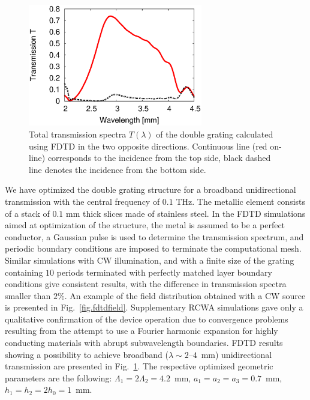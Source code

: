 \documentclass[10pt,letterpaper,twocolumn]{article} %
\begin{document}
\begin{figure}
 \begin{center}
 \includegraphics[width=3in]{fig3.eps}
\end{center}
\caption{Total transmission spectra $T(\lambda)$ of the double grating calculated using FDTD in the two opposite directions. Continuous line (red on-line) corresponds to the incidence from the top side, black dashed line denotes the incidence from the bottom side.\label{fig.spectra}}
\end{figure} 



We have optimized the double grating structure for a broadband unidirectional transmission with the central frequency of $0.1$ THz. The metallic element consists of a stack of $0.1$ mm thick slices made of stainless steel. In the FDTD simulations aimed at optimization of the structure, the metal is assumed to be a perfect conductor, a Gaussian pulse is used to determine the transmission spectrum, and periodic boundary conditions are imposed to terminate the computational mesh. Similar simulations with CW illumination, and with a finite size of the grating containing $10$ periods terminated with perfectly matched layer boundary conditions give consistent results, with the difference in transmission spectra smaller than $2\%$. An example of the field distribution obtained with a CW source is presented in Fig.~\ref{fig.fdtdfield}. Supplementary RCWA simulations gave only a qualitative confirmation of the device operation due to convergence problems resulting from the attempt to use a Fourier harmonic expansion 
for highly conducting materials with abrupt subwavelength boundaries. FDTD results showing a possibility to achieve 
broadband ($\lambda\sim 2$--$4$~mm) unidirectional transmission are presented in Fig.~\ref{fig.spectra}. The respective optimized geometric parameters are the following: $\Lambda_1=2\Lambda_2=4.2$~mm, $a_1=a_2=a_3=0.7$~mm, $h_1=h_2=2 h_0=1$~mm. 

\end{document}
